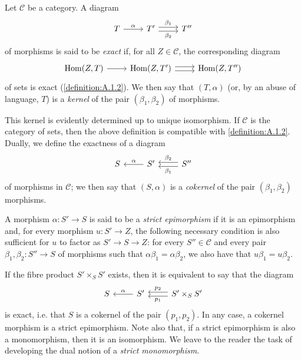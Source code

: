 \documentclass{article}
\theoremstyle{plain}
\theoremstyle{definition}
\newenvironment{definition}[1]
  {\renewcommand\theinnercustomdefinition{#1}\innercustomdefinition}
  {\endinnercustomdefinition}
\newcommand{\cat}[1]{{\mathcal{#1}}}
\DeclareMathOperator{\Hom}{Hom}
\newcommand{\oldpage}[1]{\marginpar{\footnotesize$\Big\vert$ \textit{p.~#1}}}
\begin{document}
\subsubsection{}
\label{A.2.a}

\begin{definition}{2.1}
\label{definition:A.2.1}
  Let $\cat{C}$ be a category.
  A diagram
  \[
    \begin{tikzcd}
      T \rar["\alpha"]
      & T' \rar[shift left=1,"\beta_1"] \rar[shift right=1,swap,"\beta_2"]
      & T''
    \end{tikzcd}
  \]
  of morphisms is said to be \emph{exact} if, for all $Z\in\cat{C}$, the corresponding diagram
  \[
    \begin{tikzcd}
      \Hom(Z,T) \rar
      & \Hom(Z,T') \rar[shift left=1] \rar[shift right=1]
      & \Hom(Z,T'')
    \end{tikzcd}
  \]
  of sets is exact (\cref{definition:A.1.2}).
  We then say that $(T,\alpha)$ (or, by an abuse of language, $T$) is a \emph{kernel} of the pair $(\beta_1,\beta_2)$ of morphisms.
\end{definition}

This kernel is evidently determined up to unique isomorphism.
If $\cat{C}$ is the category of sets, then the above definition is compatible with \cref{definition:A.1.2}.
Dually, we define the exactness of a diagram
\[
  \begin{tikzcd}
    S
    & S' \lar[swap,"\alpha"]
    & S''\lar[shift left=1,"\beta_1"] \lar[shift right=1,swap,"\beta_2"]
  \end{tikzcd}
\]
of morphisms in $\cat{C}$;
we then say that $(S,\alpha)$ is a \emph{cokernel} of the pair $(\beta_1,\beta_2)$ morphisms.

\begin{definition}{2.2}
\label{definition:A.2.2}
  A morphism $\alpha\colon S'\to S$ is said to be a \emph{strict epimorphism} if it is an epimorphism and, for every morphism $u\colon S'\to Z$, the following necessary condition is also sufficient for $u$ to factor as $S'\to S\to Z$:
  for every $S''\in\cat{C}$ and every pair $\beta_1,\beta_2\colon S''\to S$ of morphisms such that $\alpha\beta_1=\alpha\beta_2$, we also have that $u\beta_1=u\beta_2$.
\end{definition}

If the fibre product $S'\times_S S'$ exists, then it is equivalent to say that the diagram
\[
  \begin{tikzcd}
    S
    & S' \lar[swap,"\alpha"]
    & S'\times_S S'\lar[shift left=1,"p_1"] \lar[shift right=1,swap,"p_2"]
  \end{tikzcd}
\]
\oldpage{190-07}
is exact, i.e. that $S$ is a cokernel of the pair $(p_1,p_2)$.
In any case, a cokernel morphism is a strict epimorphism.
Note also that, if a strict epimorphism is also a monomorphism, then it is an isomorphism.
We leave to the reader the task of developing the dual notion of a \emph{strict monomorphism}.
\end{document}
